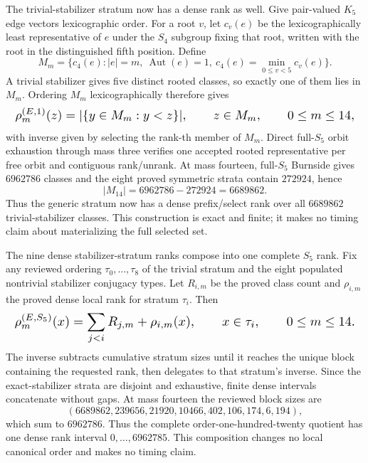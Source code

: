 \documentclass{article}
\newcommand{\fitmath}[1]{\resizebox{0.99\linewidth}{!}{$\displaystyle #1$}}
\begin{document}
The trivial-stabilizer stratum now has a dense rank as well. Give pair-valued
$K_5$ edge vectors lexicographic order. For a root $v$, let $c_v(e)$ be the
lexicographically least representative of $e$ under the $S_4$ subgroup fixing
that root, written with the root in the distinguished fifth position. Define
\[
  M_m=\{c_4(e): |e|=m,\ \operatorname{Aut}(e)=1,
    \ c_4(e)=\min_{0\leq v<5} c_v(e)\}.
\]
A trivial stabilizer gives five distinct rooted classes, so exactly one of them
lies in $M_m$. Ordering $M_m$ lexicographically therefore gives
\begin{equation}
  \fitmath{%
    \rho^{(E,1)}_m(z)=|\{y\in M_m:y<z\}|,
    \qquad z\in M_m,
    \qquad 0\leq m\leq14,
  }
  \label{eq:optimization-crazy-quintuple-s5-trivial-ranking}
\end{equation}
with inverse given by selecting the rank-th member of $M_m$. Direct full-$S_5$
orbit exhaustion through mass three verifies one accepted rooted representative
per free orbit and contiguous rank/unrank. At mass fourteen, full-$S_5$
Burnside gives $6962786$ classes and the eight proved symmetric strata contain
$272924$, hence
\[
  |M_{14}|=6962786-272924=6689862.
\]
Thus the generic stratum now has a dense prefix/select rank over all
$6689862$ trivial-stabilizer classes. This construction is exact and finite; it
makes no timing claim about materializing the full selected set.

The nine dense stabilizer-stratum ranks compose into one complete $S_5$ rank.
Fix any reviewed ordering $\tau_0,\ldots,\tau_8$ of the trivial stratum and the
eight populated nontrivial stabilizer conjugacy types. Let $R_{i,m}$ be the
proved class count and $\rho_{i,m}$ the proved dense local rank for stratum
$\tau_i$. Then
\begin{equation}
  \fitmath{%
    \rho^{(E,S_5)}_m(x)
      =\sum_{j<i}R_{j,m}+\rho_{i,m}(x),
    \qquad x\in\tau_i,
    \qquad 0\leq m\leq14.
  }
  \label{eq:optimization-crazy-quintuple-s5-complete-ranking}
\end{equation}
The inverse subtracts cumulative stratum sizes until it reaches the unique block
containing the requested rank, then delegates to that stratum's inverse. Since
the exact-stabilizer strata are disjoint and exhaustive, finite dense intervals
concatenate without gaps. At mass fourteen the reviewed block sizes are
\[
(6689862,239656,21920,10466,402,106,174,6,194),
\]
which sum to $6962786$. Thus the complete order-one-hundred-twenty quotient has
one dense rank interval $0,\ldots,6962785$. This composition changes no local
canonical order and makes no timing claim.
\end{document}
